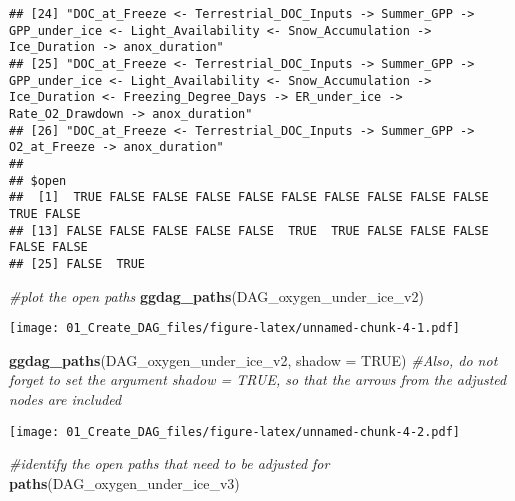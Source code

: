 \documentclass[
]{article}
\newenvironment{Shaded}{\begin{snugshade}}{\end{snugshade}}
\newcommand{\AttributeTok}[1]{\textcolor[rgb]{0.13,0.29,0.53}{#1}}
\newcommand{\CommentTok}[1]{\textcolor[rgb]{0.56,0.35,0.01}{\textit{#1}}}
\newcommand{\ConstantTok}[1]{\textcolor[rgb]{0.56,0.35,0.01}{#1}}
\newcommand{\FunctionTok}[1]{\textcolor[rgb]{0.13,0.29,0.53}{\textbf{#1}}}
\newcommand{\NormalTok}[1]{#1}
\begin{document}
\begin{verbatim}
## [24] "DOC_at_Freeze <- Terrestrial_DOC_Inputs -> Summer_GPP -> GPP_under_ice <- Light_Availability <- Snow_Accumulation -> Ice_Duration -> anox_duration"                                                                             
## [25] "DOC_at_Freeze <- Terrestrial_DOC_Inputs -> Summer_GPP -> GPP_under_ice <- Light_Availability <- Snow_Accumulation -> Ice_Duration <- Freezing_Degree_Days -> ER_under_ice -> Rate_O2_Drawdown -> anox_duration"                 
## [26] "DOC_at_Freeze <- Terrestrial_DOC_Inputs -> Summer_GPP -> O2_at_Freeze -> anox_duration"                                                                                                                                         
## 
## $open
##  [1]  TRUE FALSE FALSE FALSE FALSE FALSE FALSE FALSE FALSE FALSE  TRUE FALSE
## [13] FALSE FALSE FALSE FALSE FALSE  TRUE  TRUE FALSE FALSE FALSE FALSE FALSE
## [25] FALSE  TRUE
\end{verbatim}

\begin{Shaded}
\begin{Highlighting}[]
\CommentTok{\#plot the open  paths }
\FunctionTok{ggdag\_paths}\NormalTok{(DAG\_oxygen\_under\_ice\_v2)}
\end{Highlighting}
\end{Shaded}

\texttt{[image: 01\_Create\_DAG\_files/figure-latex/unnamed-chunk-4-1.pdf]}

\begin{Shaded}
\begin{Highlighting}[]
\FunctionTok{ggdag\_paths}\NormalTok{(DAG\_oxygen\_under\_ice\_v2, }\AttributeTok{shadow =} \ConstantTok{TRUE}\NormalTok{) }\CommentTok{\#Also, do not forget to set the argument shadow = TRUE, so that the arrows from the adjusted nodes are included}
\end{Highlighting}
\end{Shaded}

\texttt{[image: 01\_Create\_DAG\_files/figure-latex/unnamed-chunk-4-2.pdf]}

\begin{Shaded}
\begin{Highlighting}[]
\CommentTok{\#identify the open paths that need to be adjusted for }
\FunctionTok{paths}\NormalTok{(DAG\_oxygen\_under\_ice\_v3)}
\end{Highlighting}
\end{Shaded}
\end{document}
